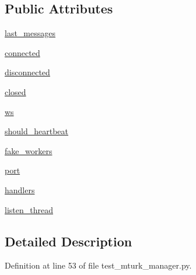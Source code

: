 \subsection*{Public Attributes}
\begin{DoxyCompactItemize}
\item 
\hyperlink{classparlai_1_1mturk_1_1core_1_1test_1_1test__mturk__manager_1_1MockSocket_a109e948980eaa445c2bdb17e6e05df53}{last\+\_\+messages}
\item 
\hyperlink{classparlai_1_1mturk_1_1core_1_1test_1_1test__mturk__manager_1_1MockSocket_aa6b77ac8ae9d091502941c50b61d29b7}{connected}
\item 
\hyperlink{classparlai_1_1mturk_1_1core_1_1test_1_1test__mturk__manager_1_1MockSocket_a774451d59258d2ee0d00e3905fcdbd06}{disconnected}
\item 
\hyperlink{classparlai_1_1mturk_1_1core_1_1test_1_1test__mturk__manager_1_1MockSocket_a7d23d7e646c285d2fbf728cd5a789b14}{closed}
\item 
\hyperlink{classparlai_1_1mturk_1_1core_1_1test_1_1test__mturk__manager_1_1MockSocket_a57efd8037541e77e7130b0c1e043eb5c}{ws}
\item 
\hyperlink{classparlai_1_1mturk_1_1core_1_1test_1_1test__mturk__manager_1_1MockSocket_a5f423e4be80eb25e28b93dbabc3eb1fe}{should\+\_\+heartbeat}
\item 
\hyperlink{classparlai_1_1mturk_1_1core_1_1test_1_1test__mturk__manager_1_1MockSocket_a9cd8bf33bf2409213099c1f7552dd8df}{fake\+\_\+workers}
\item 
\hyperlink{classparlai_1_1mturk_1_1core_1_1test_1_1test__mturk__manager_1_1MockSocket_a5375a51830c7fe227cead1da423152a1}{port}
\item 
\hyperlink{classparlai_1_1mturk_1_1core_1_1test_1_1test__mturk__manager_1_1MockSocket_ac41f50031562177c1fd91a2145614e58}{handlers}
\item 
\hyperlink{classparlai_1_1mturk_1_1core_1_1test_1_1test__mturk__manager_1_1MockSocket_ac4f3498fc9af80a73ede6cfb26d09847}{listen\+\_\+thread}
\end{DoxyCompactItemize}


\subsection{Detailed Description}


Definition at line 53 of file test\+\_\+mturk\+\_\+manager.\+py.




